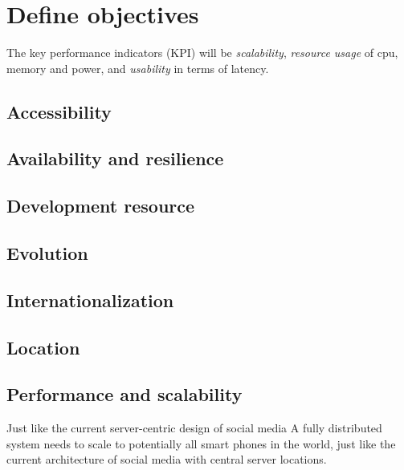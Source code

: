 \section{Define objectives} %




The key performance indicators (KPI) will be \emph{scalability}, \emph{resource usage} of cpu, memory and power, and \emph{usability} in terms of latency.


\subsection{Accessibility}

\subsection{Availability and resilience}

\subsection{Development resource}

\subsection{Evolution}

\subsection{Internationalization}

\subsection{Location}

\subsection{Performance and scalability}
Just like the current server-centric design of social media
A fully distributed system needs to scale to potentially all smart phones in the world, just like the current architecture of social media with central server locations.


